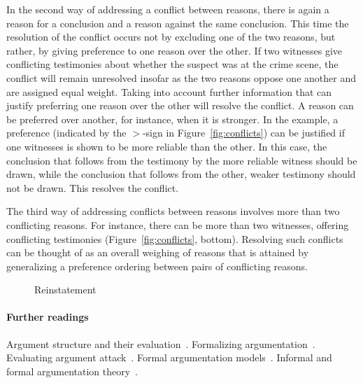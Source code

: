 \documentclass[10pt]{article}
\begin{document}
In the second way of addressing a conflict between reasons, there is again a reason for a conclusion 
and a reason against the same conclusion. This time the resolution of the conflict
occurs not by excluding one of the two reasons, but rather, by giving preference to one reason over the other.
If two witnesses give conflicting testimonies about whether the suspect was at the crime scene, 
the conflict will remain unresolved insofar as the 
two reasons oppose one another and are assigned equal weight. %
Taking into account further information that can justify preferring one 
reason over the other will resolve the conflict. A reason can be preferred over another, for instance, when it is stronger. 
In the example, a preference (indicated by the $>$-sign in Figure~\ref{fig:conflicts}) 
can be justified if one witnesses is shown to be more reliable than the other. In this case, the conclusion that 
follows from the testimony by the more reliable witness should be drawn, while the conclusion that follows from the other, weaker 
testimony should not be drawn. This resolves the conflict. 

The third way of addressing conflicts between reasons involves 
more than two conflicting reasons. For instance, there can be more 
than two witnesses, offering conflicting testimonies (Figure~\ref{fig:conflicts}, bottom). %
Resolving such conflicts can be thought of as an overall 
weighing of reasons that is attained by generalizing 
a preference ordering between pairs of conflicting reasons. 





\begin{figure}[bt]
\centering

\caption{Reinstatement\label{fig:reinstatement}}
\end{figure}


\paragraph{Further readings}
Argument structure and their evaluation~\citep{pollock1995}. Formalizing argumentation~\citep{prakkenVreeswijk2002}. Evaluating argument attack~\citep{dung1995}. 
Formal argumentation models~\citep{simariLoui1992, vreeswijk1997, prakken2010, verheij2003deflog, gordonEtal2007}. Informal and formal argumentation theory~\citep{vanEemerenEtal2014}.
\end{document}
